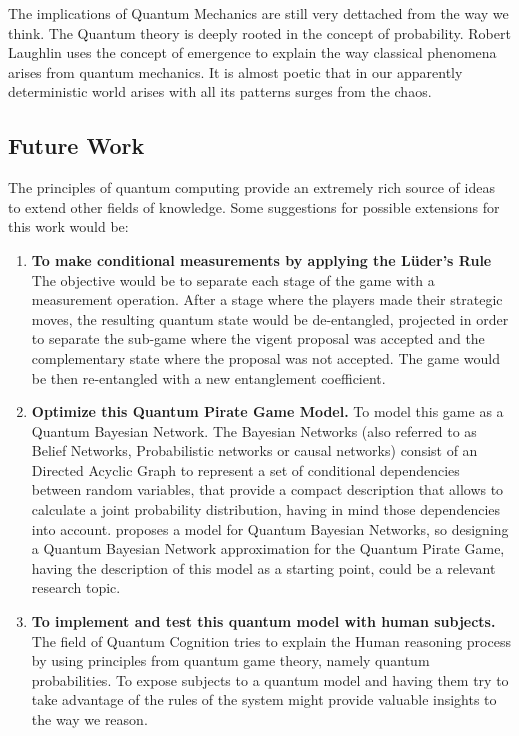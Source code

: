 \documentclass[10pt,twocolumn]{llncs}
\begin{document}
The implications of Quantum Mechanics are still very dettached from the way we think. The Quantum theory is deeply rooted in the concept of probability. Robert Laughlin uses the concept of emergence to explain the way classical phenomena arises from quantum mechanics\cite{Laughlin2005}. It is almost poetic that in our apparently deterministic world arises with all its patterns surges from the chaos. 

\subsection{Future Work}
The principles of quantum computing provide an extremely rich source of ideas to extend other fields of knowledge.
Some suggestions for possible extensions for this work would be:

\begin{enumerate}

\item \textbf{To make conditional measurements by applying the L\"{u}der's Rule} The objective would be to separate each stage of the game with a measurement operation. After a stage where the players made their strategic moves, the resulting quantum state would be de-entangled, projected in order to separate  the sub-game where the vigent proposal was accepted and the complementary state where the proposal was not accepted. The game would be then re-entangled with a new entanglement coefficient. 

\item \textbf{Optimize this Quantum Pirate Game Model.} To model this game as a Quantum Bayesian Network. The Bayesian Networks (also referred to as Belief Networks, Probabilistic networks or causal networks) consist of an Directed Acyclic Graph to represent a set of conditional dependencies between random variables, that provide a compact description that allows to calculate a joint probability distribution, having in mind those dependencies into account. \cite{Tucci2012} proposes a model for Quantum Bayesian Networks, so designing a Quantum Bayesian Network approximation for the Quantum Pirate Game, having the description of this model as a starting point, could be a relevant research topic.

\item \textbf{To implement and test this quantum model with human subjects.} The field of Quantum Cognition tries to explain the Human reasoning process by using principles from quantum game theory, namely quantum probabilities. To expose subjects to a quantum model and having them try to take advantage of the rules of the system might provide valuable insights to the way we reason. 


\end{enumerate}
\end{document}

